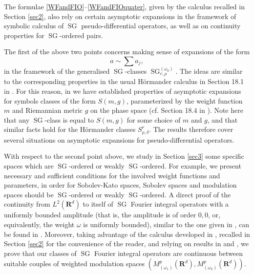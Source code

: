 \documentclass[12pt,a4paper,reqno]{amsart}
\numberwithin{equation}{section}
\numberwithin{thm}{section}
\theoremstyle{definition}
\theoremstyle{remark}
\begin{document}
\par

The formulae \eqref{WFandFIO}--\eqref{WFandFIOquater}, given by
the calculus recalled in Section \ref{sec2}, also rely on
certain asymptotic expansions in the framework of symbolic calculus of
${\operatorname{SG}}$ pseudo-differential operators, as well as on continuity properties for
${\operatorname{SG}}$-ordered pairs. 

The first of the above two points concerns making sense of expansions of the form
$$
a\sim \sum a_j ,
$$
in the framework of the generalised ${\operatorname{SG}}$-classes ${\operatorname{SG}}^{(\omega_0)}_{r,\rho}$.
The ideas are similar to the corresponding
properties in the usual H{\"o}rmander calculus in Section 18.1 in \cite{Ho1}. For
this reason, in \cite{CoTo} we have established properties of asymptotic
expansions for symbols classes of the form $S(m,g)$, parameterized
by the weight function $m$ and Riemannian metric $g$ on the phase
space (cf. Section 18.4 in \cite{Ho1}). Note here that any ${\operatorname{SG}}$-class is equal
to $S(m,g)$ for some choice of $m$ and $g$, and that similar
facts hold for the H{\"o}rmander classes $S^r _{\rho ,\delta}$. The results
therefore cover several situations on asymptotic expansions for
pseudo-differential operators.

\par

With respect to the second point above,
we study in Section \ref{sec3} some specific spaces which are
${\operatorname{SG}}$-ordered or weakly ${\operatorname{SG}}$-ordered. For example, we present necessary and
sufficient conditions for the involved weight functions and parameters, in order
for Sobolev-Kato spaces, Sobolev spaces and modulation spaces should be
${\operatorname{SG}}$-ordered or weakly ${\operatorname{SG}}$-ordered. A direct proof
of the continuity from $L^2({\mathbf R^{{d}}})$ to itself of ${\operatorname{SG}}$ Fourier integral operators
with a uniformly bounded amplitude (that is, the amplitude is of order $0,0$, or,
equivalently, the weight $\omega$ is uniformly bounded), similar to the one given 
in \cite{coriasco}, can be found in \cite{CoTo2}. Moreover, taking advantage of
the calculus developed in \cite{CoTo2}, recalled in Section \ref{sec2} for the convenience
of the reader, and relying on results in 
\cite{CorNicRod1} and \cite{GT}, we prove that our classes of ${\operatorname{SG}}$ Fourier
integral operators are continuous between suitable couples of weighted
modulation spaces $(M^p_{(\omega_1)}({\mathbf R^{{d}}}), M^p_{(\omega_2)}({\mathbf R^{{d}}}))$.
\end{document}
